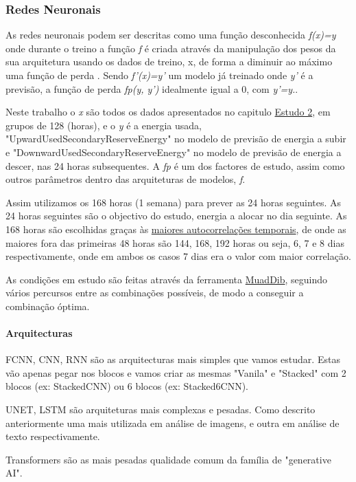\subsubsection{Redes Neuronais}

As redes neuronais podem ser descritas como uma função desconhecida \textit{f(x)=y} onde durante o treino a função \textit{f} é criada através da manipulação dos pesos da sua arquitetura usando os dados de treino, x, de forma a diminuir ao máximo uma função de perda . Sendo \textit{f'(x)=y'} um modelo já treinado onde \textit{y'} é a previsão, a função de perda \textit{fp(y, y')} idealmente igual a 0, com \textit{y'=y.}.\par
Neste trabalho o \textit{x} são todos os dados apresentados no capitulo \hyperref[ch:estudo_2]{Estudo 2}, em grupos de 128 (horas), e o \textit{y} é a energia usada, "UpwardUsedSecondaryReserveEnergy" no modelo de previsão de energia a subir e "DownwardUsedSecondaryReserveEnergy" no modelo de previsão de energia a descer, nas 24 horas subsequentes. A \textit{fp} é um dos factores de estudo, assim como outros parâmetros dentro das arquiteturas de modelos, \textit{f}.\par
Assim utilizamos os 168 horas (1 semana) para prever as 24 horas seguintes. As 24 horas seguintes são o objectivo do estudo, energia a alocar no dia seguinte. As 168 horas são escolhidas graças às \hyperref[tab:tempcorr]{maiores autocorrelações temporais}, de onde as maiores fora das primeiras 48 horas são 144, 168, 192 horas ou seja, 6, 7 e 8 dias respectivamente, onde em ambos os casos 7 dias era o valor com maior correlação.\par
As condições em estudo são feitas através da ferramenta \hyperref[se:muaddib]{MuadDib}, seguindo vários percursos entre as combinações possíveis, de modo a conseguir a combinação óptima.\par

\paragraph{Arquitecturas}
\text{ }  \par

\gls{FCNN}, \gls{CNN}, RNN são as arquitecturas mais simples que vamos estudar. Estas vão apenas pegar nos blocos e vamos criar as mesmas "Vanila" e "Stacked" com 2 blocos (ex: StackedCNN) ou 6 blocos (ex: Stacked6CNN).\par
UNET, \gls{LSTM} são arquiteturas mais complexas e pesadas. Como descrito anteriormente uma mais utilizada em análise de imagens, e outra em análise de texto respectivamente.\par
Transformers são as mais pesadas qualidade comum da família de "generative AI".

